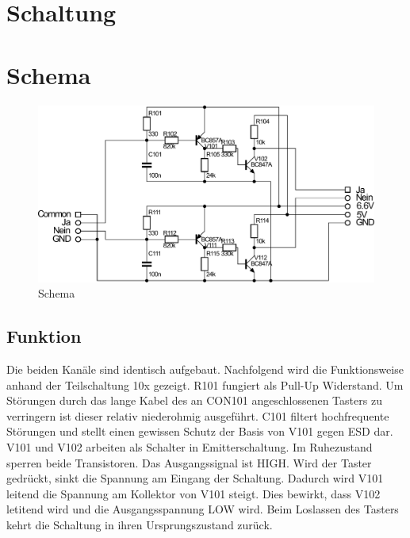 
\section{Schaltung}

\section{Schema}
\begin{figure}[h!]
	\centering
	\includegraphics[scale=\schscale]{fig/xlr_pegelwandler_v_1_2_sch.pdf}
	\caption{Schema}
	\label{sch:pegw}
\end{figure}

\subsection{Funktion}
Die beiden Kanäle sind identisch aufgebaut. Nachfolgend wird die Funktionsweise anhand der Teilschaltung 10x gezeigt. R101 fungiert als Pull-Up Widerstand. Um Störungen durch das lange Kabel des an CON101 angeschlossenen Tasters zu verringern ist dieser relativ niederohmig ausgeführt. C101 filtert hochfrequente Störungen und stellt einen gewissen Schutz der Basis von V101 gegen ESD dar. V101 und V102 arbeiten als Schalter in Emitterschaltung. Im Ruhezustand sperren beide Transistoren. Das Ausgangssignal ist HIGH. Wird der Taster gedrückt, sinkt die Spannung am Eingang der Schaltung. Dadurch wird V101 leitend die Spannung am Kollektor von V101 steigt. Dies bewirkt, dass V102 letitend wird und die Ausgangsspannung LOW wird. Beim Loslassen des Tasters kehrt die Schaltung in ihren Ursprungszustand zurück. 

